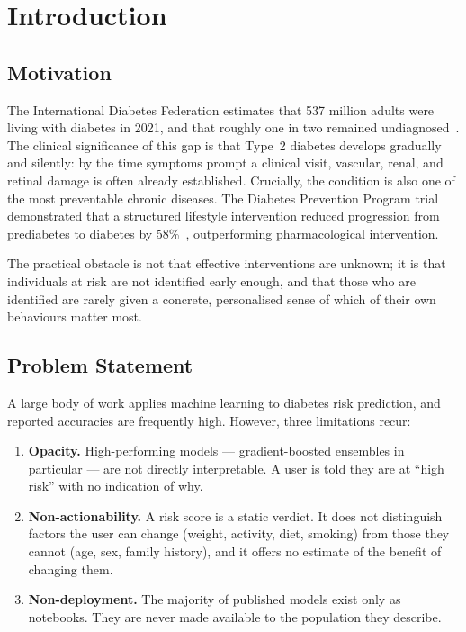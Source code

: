 \documentclass[11pt,a4paper]{article}
\begin{document}
\newpage

\section{Introduction}

\subsection{Motivation}
The International Diabetes Federation estimates that 537 million adults were
living with diabetes in 2021, and that roughly one in two remained
undiagnosed~\cite{idf2021}. The clinical significance of this gap is that
Type~2 diabetes develops gradually and silently: by the time symptoms prompt a
clinical visit, vascular, renal, and retinal damage is often already
established. Crucially, the condition is also one of the most preventable
chronic diseases. The Diabetes Prevention Program trial demonstrated that a
structured lifestyle intervention reduced progression from prediabetes to
diabetes by 58\%~\cite{dpp2002}, outperforming pharmacological intervention.

The practical obstacle is not that effective interventions are unknown; it is
that individuals at risk are not identified early enough, and that those who
are identified are rarely given a concrete, personalised sense of which of
their own behaviours matter most.

\subsection{Problem Statement}
A large body of work applies machine learning to diabetes risk prediction, and
reported accuracies are frequently high. However, three limitations recur:

\begin{enumerate}[label=(\roman*)]
  \item \textbf{Opacity.} High-performing models --- gradient-boosted ensembles
        in particular --- are not directly interpretable. A user is told they
        are at ``high risk'' with no indication of why.
  \item \textbf{Non-actionability.} A risk score is a static verdict. It does
        not distinguish factors the user can change (weight, activity, diet,
        smoking) from those they cannot (age, sex, family history), and it
        offers no estimate of the benefit of changing them.
  \item \textbf{Non-deployment.} The majority of published models exist only as
        notebooks. They are never made available to the population they
        describe.
\end{enumerate}
\end{document}
